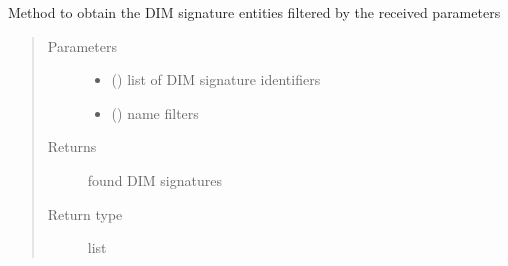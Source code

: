 \begin{fulllineitems}
\begin{fulllineitems}
\begin{quote}
\begin{description}
\end{description}\end{quote}

\end{fulllineitems}


\begin{fulllineitems}
\label{\detokenize{eboa.engine:eboa.engine.query.Query.get_report_groups}}
Method to obtain the DIM signature entities filtered by the received parameters
\begin{quote}\begin{description}
\item[{Parameters}] \leavevmode\begin{itemize}
\item {} 
 () \textendash{} list of DIM signature identifiers

\item {} 
 () \textendash{} name filters

\end{itemize}

\item[{Returns}] \leavevmode
found DIM signatures

\item[{Return type}] \leavevmode
list

\end{description}\end{quote}

\end{fulllineitems}



\end{fulllineitems}
